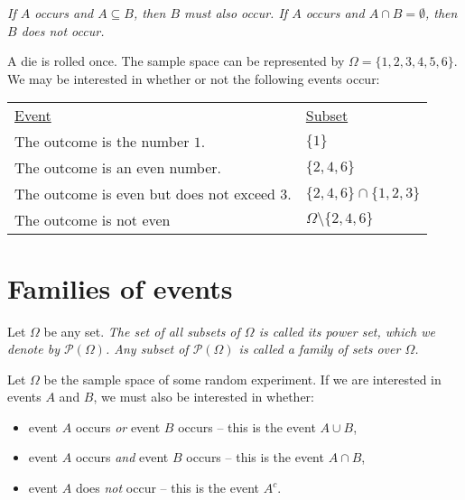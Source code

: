 \begin{remark}
\bit
\it If $A$ occurs and $A\subseteq B$, then $B$ must also occur.
\it If $A$ occurs and $A\cap B=\emptyset$, then $B$ does not occur. 
\eit
\end{remark}

\begin{example}
A die is rolled once. The sample space can be represented by $\Omega=\{1,2,3,4,5,6\}$.
We may be interested in whether or not the following events occur:
\begin{center}
\begin{tabular}{ll}
\underline{Event} & \underline{Subset} \\ 
The outcome is the number $1$.	& $\{1\}$ \\
The outcome is an even number.	& $\{2,4,6\}$ \\
The outcome is even but does not exceed $3$.	& $\{2,4,6\}\cap\{1,2,3\}$ \\
The outcome is not even			& $\Omega\setminus\{2,4,6\}$
\end{tabular}
\end{center}
\end{example}

\section{Families of events}
\begin{definition}
Let $\Omega$ be any set. 
\ben
\it The set of all subsets of $\Omega$ is called its \emph{power set}, which we denote by $\mathcal{P}(\Omega)$.
\it Any subset of $\mathcal{P}(\Omega)$ is called a \emph{family of sets over $\Omega$}.
\een
\end{definition}

Let $\Omega$ be the sample space of some random experiment. 
If we are interested in events $A$ and $B$, we must also be interested in whether:

\begin{itemize}
\item event $A$ occurs \emph{or} event $B$ occurs -- this is the event $A\cup B$,
\item event $A$ occurs \emph{and} event $B$ occurs -- this is the event $A\cap B$,
\item event $A$ does \emph{not} occur -- this is the event $A^c$.
\end{itemize}

